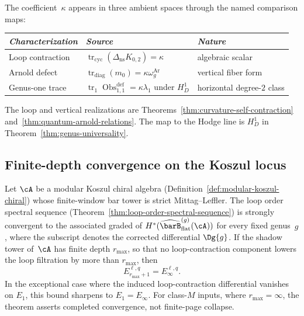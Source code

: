 \begin{remark}%
\label{rem:three-faces-kappa}
The coefficient~$\kappa$ appears in three ambient spaces through the
named comparison maps:
\begin{center}
\small
\renewcommand{\arraystretch}{1.2}
\begin{tabular}{lll}
\toprule
\emph{Characterization} & \emph{Source} & \emph{Nature} \\
\midrule
Loop contraction &
$\operatorname{tr}_{\mathrm{cyc}}(\Delta_{\mathrm{ns}}K_{0,2})=\kappa$
& algebraic scalar \\
Arnold defect & $\operatorname{tr}_{\mathrm{diag}}(m_0)
=\kappa \omega_g^{\mathrm{Ar}}$ & vertical fiber form \\
Genus-one trace &
$\operatorname{tr}_1\operatorname{Obs}^{\mathrm{def}}_{1,1}
=\kappa\lambda_1$ under $H_D^1$ & horizontal degree-$2$ class \\
\bottomrule
\end{tabular}
\end{center}
The loop and vertical realizations are
Theorems~\ref{thm:curvature-self-contraction}
and~\ref{thm:quantum-arnold-relations}.  The map to the Hodge line is
$H_D^1$ in Theorem~\ref{thm:genus-universality}.
\end{remark}

\subsection{Finite-depth convergence on the Koszul locus}
\label{subsec:loop-order-collapse}

\begin{theorem}\label{thm:loop-order-collapse}
Let $\cA$ be a modular Koszul chiral algebra
\textup{(}Definition~\textup{\ref{def:modular-koszul-chiral})}
whose finite-window bar tower is strict Mittag--Leffler.
The loop order spectral sequence
\textup{(}Theorem~\textup{\ref{thm:loop-order-spectral-sequence})}
is strongly convergent to the associated graded of
$H^*(\widehat{\barB}^{(g)}_{\mathrm{flat}}(\cA))$ for every fixed
genus~$g$, where the subscript denotes the corrected differential
$\Dg{g}$.
If the shadow tower of~$\cA$ has finite depth $r_{\max}$, so that no
loop-contraction component lowers the loop filtration by more than
$r_{\max}$, then
\begin{equation}\label{eq:loop-collapse-bound}
E_{r_{\max}+1}^{\ell,q}=E_\infty^{\ell,q}.
\end{equation}
In the exceptional case where the induced loop-contraction
differential vanishes on $E_1$, this bound sharpens to
$E_1=E_\infty$. For class-$M$ inputs, where
$r_{\max}=\infty$, the theorem asserts completed convergence, not
finite-page collapse.
\end{theorem}

